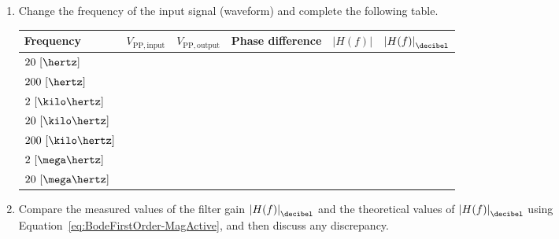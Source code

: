 \begin{enumerate}
  
\item Change the frequency of the input signal (waveform) and complete the following table.
%
    \begin{center}
    \begin{tabular}{l|c|c|c|c|c}
      \toprule
      Frequency &  $V_{\mathrm{PP,input}}$ & $V_{\mathrm{PP,output}}$ & Phase difference & $\left |H(f) \right |$ & $\left |H(f) \right |_{\decibel}$\\
      \toprule
      $20~[\hertz]$ & ~ & ~ & ~ & ~ & ~\\
      $200~[\hertz]$ & ~ & ~ & ~ & ~ & ~\\
      $2~[\kilo\hertz]$ & ~ & ~ & ~ & ~ & ~\\
      $20~[\kilo\hertz]$ & ~ & ~ & ~ & ~ & ~\\
      $200~[\kilo\hertz]$ & ~ & ~ & ~ & ~ & ~\\
      $2~[\mega\hertz]$ & ~ & ~ & ~ & ~ & ~\\
      $20~[\mega\hertz]$ & ~ & ~ & ~ & ~ & ~\\      
      \bottomrule
    \end{tabular}    
  \end{center}
%  
\item Compare the measured values of the filter gain $\left|H(f)\right |_{\decibel}$ and the theoretical values of $\left|H(f)\right |_{\decibel}$ using Equation~\eqref{eq:BodeFirstOrder-MagActive}, and then discuss any discrepancy.

 \end{enumerate}
 






